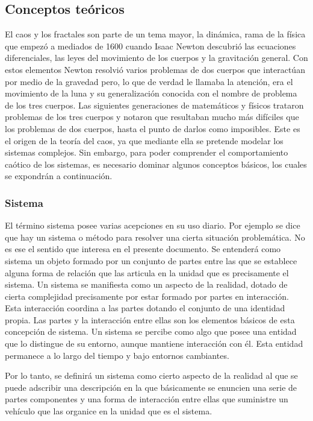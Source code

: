 \documentclass[letterpaper, 11pt, oneside]{article}
\theoremstyle{definition}
\theoremstyle{remark}
\begin{document}
\subsection{Conceptos teóricos}
El caos y los fractales son parte de un tema mayor, la dinámica, rama de la física que empezó a mediados de 1600 cuando Isaac Newton descubrió las ecuaciones diferenciales, las leyes del movimiento de los cuerpos y la gravitación general. Con estos elementos Newton resolvió varios problemas de dos cuerpos que interactúan por medio de la gravedad pero, lo que de verdad le llamaba la atención, era el movimiento de la luna y su generalización conocida con el nombre de problema de los tres cuerpos. Las siguientes generaciones de matemáticos y físicos trataron problemas de los tres cuerpos y notaron que resultaban mucho más difíciles que los problemas de dos cuerpos, hasta el punto de darlos como imposibles. Este es el origen de la teoría del caos, ya que mediante ella se pretende modelar los sistemas complejos. Sin embargo, para poder comprender el comportamiento caótico de los sistemas, es necesario dominar algunos conceptos básicos, los cuales se expondrán a continuación. \cite{Romero}

\subsubsection{Sistema}


El término sistema posee varias acepciones en su uso diario. Por ejemplo se dice que hay un sistema o método para resolver una cierta situación problemática. No es ese el sentido que interesa en el presente documento. Se entenderá como sistema un objeto formado por un conjunto de partes entre las que se establece alguna forma de relación que las articula en la unidad que es precisamente el sistema. Un sistema se manifiesta como un aspecto de la realidad, dotado de cierta complejidad precisamente por estar formado por partes en interacción. Esta interacción coordina a las partes dotando el conjunto de una identidad propia. Las partes y la interacción entre ellas son los elementos básicos de esta concepción de sistema. Un sistema se percibe como algo que posee una entidad que lo distingue de su entorno, aunque mantiene interacción con él. Esta entidad permanece a lo largo del tiempo y bajo entornos cambiantes.

Por lo tanto, se definirá un sistema como cierto aspecto de la realidad al que se puede adscribir una descripción en la que básicamente se enuncien una serie de partes componentes y una forma de interacción entre ellas que suministre un vehículo que las organice en la unidad que es el sistema.
\end{document}
